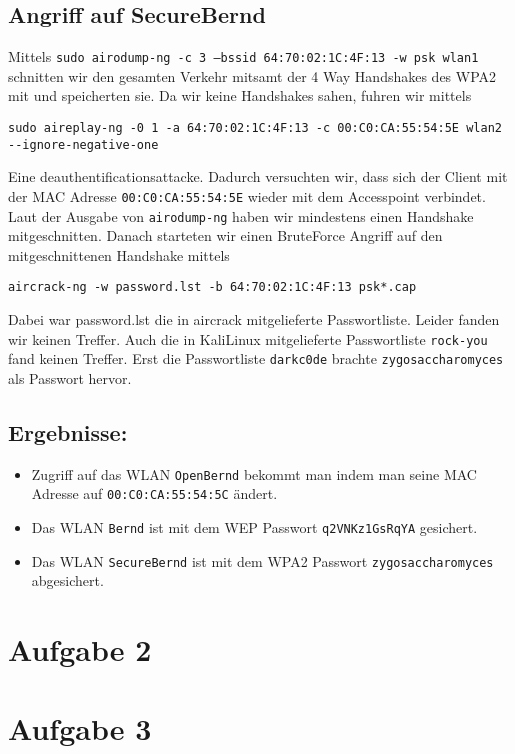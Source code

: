 \documentclass[10pt,a4paper]{article}
\begin{document}
\subsection{Angriff auf SecureBernd}

Mittels \texttt{sudo airodump-ng -c 3 --bssid 64:70:02:1C:4F:13 -w psk wlan1} schnitten wir den gesamten Verkehr mitsamt der 4 Way Handshakes des WPA2 mit und speicherten sie. Da wir keine Handshakes sahen, fuhren wir mittels 
\begin{verbatim}
sudo aireplay-ng -0 1 -a 64:70:02:1C:4F:13 -c 00:C0:CA:55:54:5E wlan2 --ignore-negative-one
\end{verbatim}
Eine deauthentificationsattacke. Dadurch versuchten wir, dass sich der Client mit der MAC Adresse
\texttt{00:C0:CA:55:54:5E} wieder mit dem Accesspoint verbindet. Laut der Ausgabe von \texttt{airodump-ng} haben wir mindestens einen Handshake mitgeschnitten.
Danach starteten wir einen BruteForce Angriff auf den mitgeschnittenen Handshake mittels
\begin{verbatim}
aircrack-ng -w password.lst -b 64:70:02:1C:4F:13 psk*.cap
\end{verbatim}
Dabei war password.lst die in aircrack mitgelieferte Passwortliste. Leider fanden wir keinen Treffer. Auch die in KaliLinux mitgelieferte Passwortliste \texttt{rock-you} fand keinen Treffer. Erst die Passwortliste \texttt{darkc0de} brachte \texttt{zygosaccharomyces} als Passwort hervor.


\subsection{Ergebnisse:}
\begin{itemize}
	\item Zugriff auf das WLAN \texttt{OpenBernd} bekommt man indem man seine MAC Adresse auf \texttt{00:C0:CA:55:54:5C} ändert.
	\item Das WLAN \texttt{Bernd} ist mit dem WEP Passwort \texttt{q2VNKz1GsRqYA} gesichert.
	\item Das WLAN \texttt{SecureBernd} ist mit dem WPA2 Passwort \texttt{zygosaccharomyces} abgesichert.
\end{itemize}



\section{Aufgabe 2}

\section{Aufgabe 3}
\end{document}
